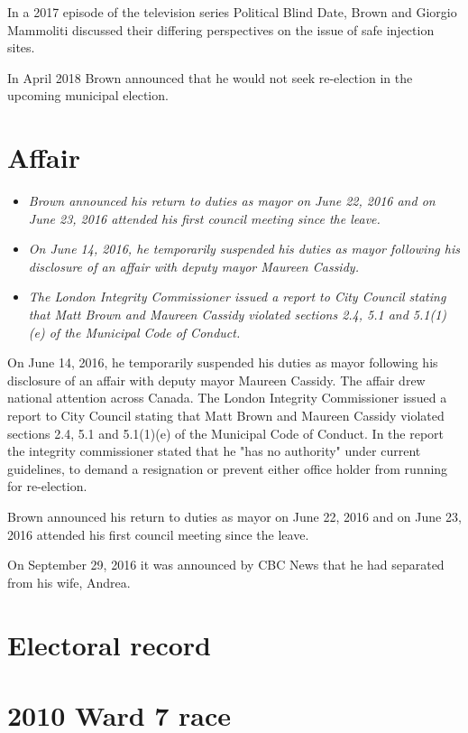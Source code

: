In a 2017 episode of the television series Political Blind Date, Brown
and Giorgio Mammoliti discussed their differing perspectives on the
issue of safe injection sites.

In April 2018 Brown announced that he would not seek re-election in the
upcoming municipal election.

\section{Affair}\label{affair}

\begin{itemize}
\item
  \emph{Brown announced his return to duties as mayor on June 22, 2016
  and on June 23, 2016 attended his first council meeting since the
  leave.}
\item
  \emph{On June 14, 2016, he temporarily suspended his duties as mayor
  following his disclosure of an affair with deputy mayor Maureen
  Cassidy.}
\item
  \emph{The London Integrity Commissioner issued a report to City
  Council stating that Matt Brown and Maureen Cassidy violated sections
  2.4, 5.1 and 5.1(1)(e) of the Municipal Code of Conduct.}
\end{itemize}

On June 14, 2016, he temporarily suspended his duties as mayor following
his disclosure of an affair with deputy mayor Maureen Cassidy. The
affair drew national attention across Canada. The London Integrity
Commissioner issued a report to City Council stating that Matt Brown and
Maureen Cassidy violated sections 2.4, 5.1 and 5.1(1)(e) of the
Municipal Code of Conduct. In the report the integrity commissioner
stated that he "has no authority" under current guidelines, to demand a
resignation or prevent either office holder from running for
re-election.

Brown announced his return to duties as mayor on June 22, 2016 and on
June 23, 2016 attended his first council meeting since the leave.

On September 29, 2016 it was announced by CBC News that he had separated
from his wife, Andrea.

\section{Electoral record}\label{electoral-record}

\section{2010 Ward 7 race}\label{ward-7-race}

